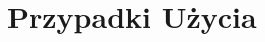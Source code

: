 \documentclass[../Dokumentacja.tex]{subfiles}
\begin{document}
\section{Przypadki Użycia}



\end{document}
